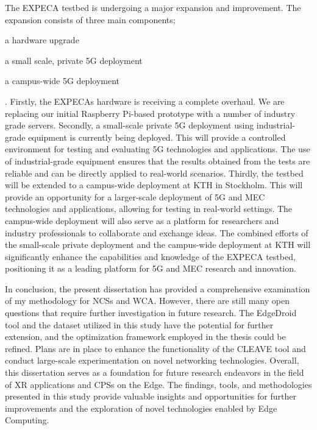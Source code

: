 The \gls{EXPECA} testbed is undergoing a major expansion and improvement.
The expansion consists of three main components;
\begin{inlineenum}
    \item a hardware upgrade
    \item a small scale, private 5G deployment
    \item a campus-wide 5G deployment
\end{inlineenum}.
Firstly, the \gls{EXPECA}s hardware is receiving a complete overhaul.
We are replacing our initial Raspberry Pi-based prototype with a number of industry grade servers.
Secondly, a small-scale private 5G deployment using industrial-grade equipment is currently being deployed.
This will provide a controlled environment for testing and evaluating 5G technologies and applications.
The use of industrial-grade equipment ensures that the results obtained from the tests are reliable and can be directly applied to real-world scenarios.
Thirdly, the testbed will be extended to a campus-wide deployment at \gls{KTH} in Stockholm.
This will provide an opportunity for a larger-scale deployment of 5G and \gls{MEC} technologies and applications, allowing for testing in real-world settings.
The campus-wide deployment will also serve as a platform for researchers and industry professionals to collaborate and exchange ideas.
The combined efforts of the small-scale private deployment and the campus-wide deployment at \gls{KTH} will significantly enhance the capabilities and knowledge of the \gls{EXPECA} testbed, positioning it as a leading platform for 5G and \gls{MEC} research and innovation.

In conclusion, the present dissertation has provided a comprehensive examination of my methodology for \glspl{NCS} and \gls{WCA}.
However, there are still many open questions that require further investigation in future research.
The EdgeDroid tool and the dataset utilized in this study have the potential for further extension, and the optimization framework employed in the thesis could be refined.
Plans are in place to enhance the functionality of the CLEAVE tool and conduct large-scale experimentation on novel networking technologies.
Overall, this dissertation serves as a foundation for future research endeavors in the field of \gls{XR} applications and \glspl{CPS} on the Edge.
The findings, tools, and methodologies presented in this study provide valuable insights and opportunities for further improvements and the exploration of novel technologies enabled by Edge Computing.